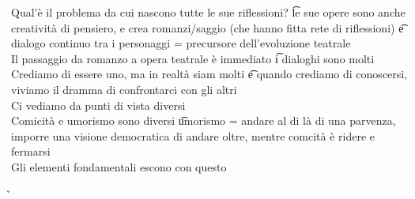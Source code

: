 \documentclass[12pt]{article}
\begin{document}
Qual'è il problema da cui nascono tutte le sue riflessioni? \t le sue opere sono anche creatività di pensiero, e crea romanzi/saggio (che hanno fitta rete di riflessioni) \t e dialogo continuo tra i personaggi = precursore dell'evoluzione teatrale \\
Il passaggio da romanzo a opera teatrale è immediato \t i dialoghi sono molti \\
Crediamo di essere uno, ma in realtà siam molti \t e quando crediamo di conoscersi, viviamo il dramma di confrontarci con gli altri \\
Ci vediamo da punti di vista diversi \\
Comicità e umorismo sono diversi \t umorismo = andare al di là di una parvenza, imporre una visione democratica di andare oltre, mentre comcità è ridere e fermarsi \\
Gli elementi fondamentali escono con questo

\v
\end{document}
